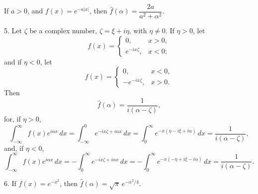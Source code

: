 If $a>0$, and $f(x)=e^{-a|x|}$, then $\hat f(\alpha)=\dfrac{2a}{a^2+\alpha^2}$.

5. Let $\zeta$ be a complex number, $\zeta=\xi+i\eta$, with $\eta\neq 0$. If $\eta>0$, let
\begin{equation*}
f(x)=
\begin{cases}
0,&x>0,\\
e^{-ix\zeta},&x<0;
\end{cases}
\end{equation*}
and if $\eta<0$, let
\begin{equation*}
f(x)=
\begin{cases}
0,&x<0,\\
-e^{-ix\zeta},&x>0.
\end{cases}
\end{equation*}
Then
\begin{equation*}
\hat f(\alpha)=\frac{1}{i(\alpha-\zeta)},
\end{equation*}
for, if $\eta>0$,
\begin{equation*}
\int_{-\infty}^{\infty}f(x)e^{i\alpha x}\,dx
=\int_{-\infty}^0 e^{-ix\zeta+i\alpha x}\,dx
=\int_0^\infty e^{-x(\eta-i\xi+i\alpha)}\,dx
=\frac{1}{i(\alpha-\zeta)},
\end{equation*}
and, if $\eta<0$,
\begin{equation*}
\int_{-\infty}^{\infty}f(x)e^{i\alpha x}\,dx
=-\int_0^\infty e^{-ix\zeta+i\alpha x}\,dx
=-\int_0^\infty e^{-x(-\eta+i\xi-i\alpha)}\,dx
=\frac{1}{i(\alpha-\zeta)}.
\end{equation*}

6. If $f(x)=e^{-x^2}$, then $\hat f(\alpha)=\sqrt\pi\,e^{-\alpha^2/4}$.

